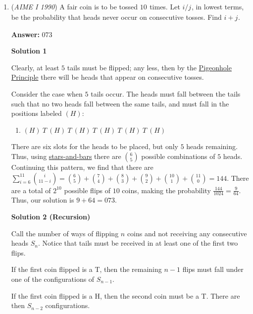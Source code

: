 \begin{enumerate}
\begin{enumerate}
            \end{enumerate}
            


	\item (\textit{AIME I 1990}) A fair coin is to be tossed $10_{}^{}$ times. Let $i/j^{}_{}$, in lowest terms, be the probability that heads never occur on consecutive tosses. Find $i+j_{}^{}$. 


 
 \textbf{Answer: }073



\textbf{Solution 1}

Clearly, at least $5$ tails must be flipped; any less, then by the \href{https://artofproblemsolving.com/wiki/index.php?title=Pigeonhole\_Principle}{Pigeonhole Principle} there will be heads that appear on consecutive tosses. 

 Consider the case when $5$ tails occur. The heads must fall between the tails such that no two heads fall between the same tails, and must fall in the positions labeled $(H)$:

 
            \begin{enumerate}[label=(\roman*)]
                \item $(H)\ T\ (H)\ T\ (H)\ T\ (H)\ T\ (H)\ T\ (H)$
            \end{enumerate}
            There are six slots for the heads to be placed, but only $5$ heads remaining. Thus, using \href{https://artofproblemsolving.com/wiki/index.php?title=Stars-and-bars}{stars-and-bars} there are ${6\choose5}$ possible combinations of $5$ heads. Continuing this pattern, we find that there are $\sum_{i=6}^{11} {i\choose{11-i}} = {6\choose5} + {7\choose4} + {8\choose3} + {9\choose2} + {{10}\choose1} + {{11}\choose0} = 144$. There are a total of $2^{10}$ possible flips of $10$ coins, making the probability $\frac{144}{1024} = \frac{9}{64}$. Thus, our solution is $9 + 64 = \boxed{073}$.

 



\textbf{Solution 2 (Recursion)}

Call the number of ways of flipping $n$ coins and not receiving any consecutive heads $S_n$. Notice that tails must be received in at least one of the first two flips.

 If the first coin flipped is a T, then the remaining $n-1$ flips must fall under one of the configurations of $S_{n-1}$.

 If the first coin flipped is a H, then the second coin must be a T. There are then $S_{n-2}$ configurations.


\end{enumerate}
